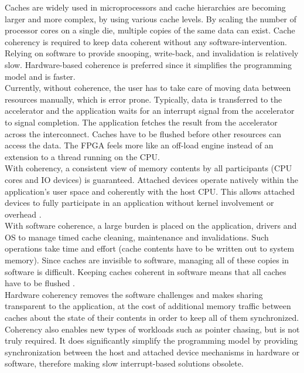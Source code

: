 Caches are widely used in microprocessors and cache hierarchies are becoming larger and more complex, by using various cache levels. By scaling the number of processor cores on a single die, multiple copies of the same data can exist. Cache coherency is required to keep data coherent without any software-intervention. Relying on software to provide snooping, write-back, and invalidation is relatively slow. Hardware-based coherence is preferred since it simplifies the programming model and is faster.\\
Currently, without coherence, the user has to take care of moving data between resources manually, which is error prone. Typically, data is transferred to the accelerator and the application waits for an interrupt signal from the accelerator to signal completion. The application fetches the result from the accelerator across the interconnect. Caches have to be flushed before other resources can access the data. The FPGA feels more like an off-load engine instead of an extension to a thread running on the CPU.\\
With coherency, a consistent view of memory contents by all participants (CPU cores and IO devices) is guaranteed. Attached devices operate natively within the application’s user space and coherently with the host CPU. This allows attached devices to fully participate in an application without kernel involvement or overhead \cite{opencapi-enablement}.\\
With software coherence, a large burden is placed on the application, drivers and OS to manage timed cache cleaning, maintenance and invalidations. Such operations take time and effort (cache contents have to be written out to system memory). Since caches are invisible to software, managing all of these copies in software is difficult. Keeping caches coherent in software means that all caches have to be flushed \cite{axi-coherence}.\\
Hardware coherency removes the software challenges and makes sharing transparent to the application, at the cost of additional memory traffic between caches about the state of their contents in order to keep all of them synchronized.\\
Coherency also enables new types of workloads such as pointer chasing, but is not truly required. It does significantly simplify the programming model by providing synchronization between the host and attached device mechanisms in hardware or software, therefore making slow interrupt-based solutions obsolete.



